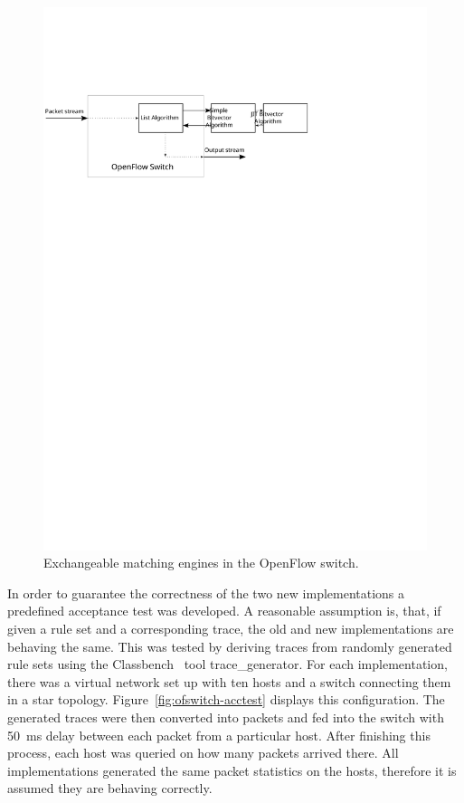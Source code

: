 \documentclass[a4paper,
		12pt,
		parskip=full,
		titlepage
		]{scrartcl}
\begin{document}
\begin{figure}
\centering
\includegraphics[height=0.2\textheight]{images/ofswitch}
\caption{Exchangeable matching engines in the OpenFlow switch.}
\label{fig:ofswitch}
\end{figure}

In order to guarantee the correctness of the two new implementations a predefined acceptance test was developed.
A reasonable assumption is, that, if given a rule set and a corresponding trace, 
the old and new implementations are behaving the same.
This was tested by deriving traces from randomly generated rule sets using 
the Classbench~\cite{classbench_website} tool \textsf{trace\_generator}.
For each implementation, there was a virtual network set up with ten hosts and a switch connecting them in a star topology.
Figure~\ref{fig:ofswitch-acctest} displays this configuration.
The generated traces were then converted into packets and fed into the switch with 50\ ms delay between each packet from a particular host.
After finishing this process, each host was queried on how many packets arrived there.
All implementations generated the same packet statistics on the hosts, therefore it is assumed they are behaving correctly.
\end{document}
